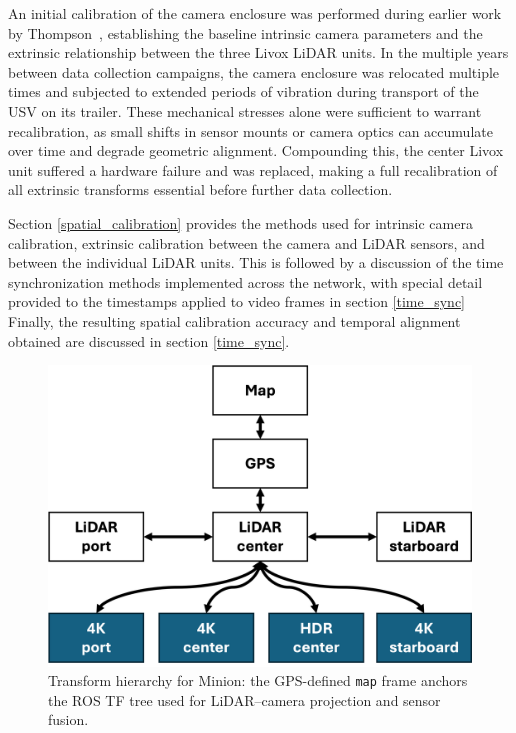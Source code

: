 \documentclass{erauthesis}
\begin{document}

An initial calibration of the camera enclosure was performed during earlier work by Thompson~\cite{thompson2023}, establishing the baseline intrinsic camera parameters and the extrinsic relationship between the three Livox LiDAR units.
In the multiple years between data collection campaigns, the camera enclosure was relocated multiple times and subjected to extended periods of vibration during transport of the \ac{USV} on its trailer.
These mechanical stresses alone were sufficient to warrant recalibration, as small shifts in sensor mounts or camera optics can accumulate over time and degrade geometric alignment.
Compounding this, the center Livox unit suffered a hardware failure and was replaced, making a full recalibration of all extrinsic transforms essential before further data collection.

Section \ref{spatial_calibration} provides the methods used for intrinsic camera calibration, extrinsic calibration between the camera and LiDAR sensors, and between the individual LiDAR units. 
This is followed by a discussion of the time synchronization methods implemented across the network, with special detail provided to the timestamps applied to video frames in section \ref{time_sync}
Finally, the resulting spatial calibration accuracy and temporal alignment obtained are discussed in section \ref{time_sync}.



\begin{figure}[htbp]
    \centering
    \includegraphics[width=0.7\linewidth]{Images/tf_tree_1.png}
    \caption{Transform hierarchy for Minion: the GPS-defined \texttt{map} frame anchors the ROS TF tree used for LiDAR–camera projection and sensor fusion.}
    \label{fig:tf_tree}
\end{figure}
\end{document}
